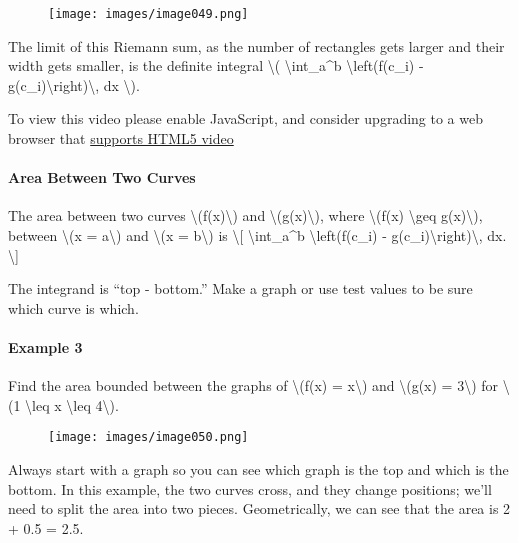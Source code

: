 \begin{figure}
\centering
\texttt{[image: images/image049.png]}
\caption{}
\end{figure}

The limit of this Riemann sum, as the number of rectangles gets larger
and their width gets smaller, is the definite integral \textbackslash{}(
\textbackslash{}int\_a\^{}b \textbackslash{}left(f(c\_i) -
g(c\_i)\textbackslash{}right)\textbackslash{}, dx \textbackslash{}).

To view this video please enable JavaScript, and consider upgrading to a
web browser that \href{http://videojs.com/html5-video-support/}{supports
HTML5 video}

\hypertarget{area-between-two-curves}{%
\paragraph{Area Between Two Curves}\label{area-between-two-curves}}

The area between two curves \textbackslash{}(f(x)\textbackslash{}) and
\textbackslash{}(g(x)\textbackslash{}), where \textbackslash{}(f(x)
\textbackslash{}geq g(x)\textbackslash{}), between \textbackslash{}(x =
a\textbackslash{}) and \textbackslash{}(x = b\textbackslash{}) is
\textbackslash{}{[} \textbackslash{}int\_a\^{}b
\textbackslash{}left(f(c\_i) -
g(c\_i)\textbackslash{}right)\textbackslash{}, dx. \textbackslash{}{]}

The integrand is ``top - bottom.'' Make a graph or use test values to be
sure which curve is which.

\hypertarget{example-3}{%
\paragraph{Example 3}\label{example-3}}

Find the area bounded between the graphs of \textbackslash{}(f(x) =
x\textbackslash{}) and \textbackslash{}(g(x) = 3\textbackslash{}) for
\textbackslash{}(1 \textbackslash{}leq x \textbackslash{}leq
4\textbackslash{}).

\begin{figure}
\centering
\texttt{[image: images/image050.png]}
\caption{}
\end{figure}

Always start with a graph so you can see which graph is the top and
which is the bottom. In this example, the two curves cross, and they
change positions; we'll need to split the area into two pieces.
Geometrically, we can see that the area is 2 + 0.5 = 2.5.

